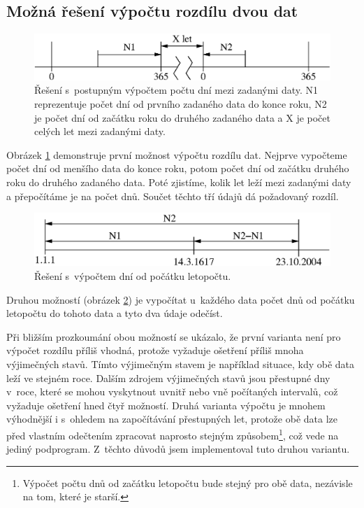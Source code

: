 \documentclass[12pt,a4paper,titlepage,final]{article}
\begin{document}
\subsection{Možná řešení výpočtu rozdílu dvou dat}

\begin{figure}
  \centering
  \includegraphics[scale=0.8]{img/datum1.eps}
  \caption{Řešení s~postupným výpočtem počtu dní mezi zadanými daty. N1
  reprezentuje počet dní od prvního zadaného data do konce roku, N2 je počet
  dní od začátku roku do druhého zadaného data a X je počet celých let mezi
  zadanými daty.}
  \label{fig:datum1}
\end{figure}

Obrázek \ref{fig:datum1} demonstruje první možnost výpočtu rozdílu dat. Nejprve
vypočteme počet dní od menšího data do konce roku, potom počet dní od začátku
druhého roku do druhého zadaného data. Poté zjistíme, kolik let leží mezi
zadanými daty a přepočítáme je na počet dnů. Součet těchto tří údajů dá
požadovaný rozdíl. 

\begin{figure}
  \centering
  \includegraphics[scale=1]{img/datum2.eps}
  \caption{Řešení s~výpočtem dní od počátku letopočtu.}
  \label{fig:datum2}
\end{figure}

Druhou možností (obrázek \ref{fig:datum2}) je vypočítat u~každého data počet
dnů od počátku letopočtu do tohoto data a tyto dva údaje odečíst.

Při bližším prozkoumání obou možností se ukázalo, že první varianta není pro
výpočet rozdílu příliš vhodná, protože vyžaduje ošetření příliš mnoha
výjimečných stavů. Tímto výjimeč\-ným stavem je například situace, kdy obě data
leží ve stejném roce. Dalším zdrojem výjimečných stavů jsou přestupné dny
v~roce, které se mohou vyskytnout uvnitř nebo vně počítaných intervalů, což
vyžaduje ošetření hned čtyř možností. Druhá varianta výpočtu je mnohem
výhodnější i s~ohledem na započítávání přestupných let, protože obě data lze
před vlastním odečtením zpracovat naprosto stejným způsobem\footnote{Výpočet
počtu dnů od začátku letopočtu bude stejný pro obě data, nezávisle na tom,
které je starší.}, což vede na jediný podprogram. Z~těchto důvodů jsem
implementoval tuto druhou variantu.
\end{document}
